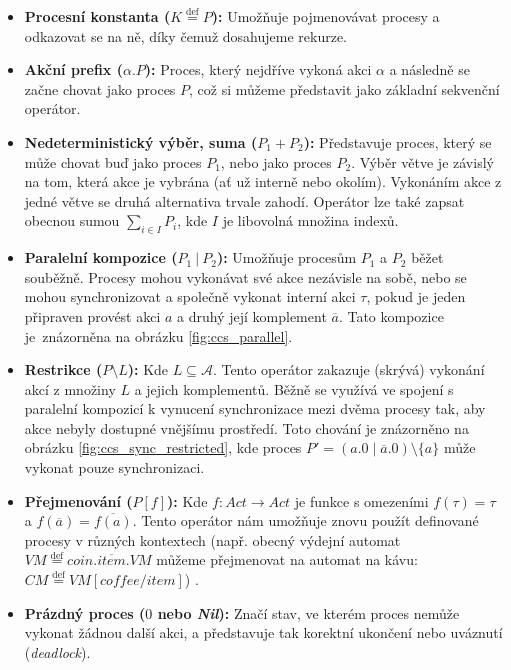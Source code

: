 \begin{itemize}
    \item \textbf{Procesní konstanta ($K \stackrel{\text{def}}{=} P$):} Umožňuje pojmenovávat procesy a odkazovat se na ně, díky čemuž dosahujeme rekurze.
    \item \textbf{Akční prefix ($\alpha.P$):} Proces, který nejdříve vykoná akci $\alpha$ a následně se začne chovat jako proces $P$, což si můžeme představit jako základní sekvenční operátor.
    \item \textbf{Nedeterministický výběr, suma ($P_{1} + P_{2}$):} Představuje proces, který se může chovat buď jako proces $P_{1}$, nebo jako proces $P_{2}$. Výběr větve je závislý na tom, která akce je vybrána (ať už interně nebo okolím). Vykonáním akce z jedné větve se druhá alternativa trvale zahodí. Operátor lze také zapsat obecnou sumou $\sum_{i \in I}^{} P_{i}$, kde $I$ je libovolná množina indexů.
    \item \textbf{Paralelní kompozice ($P_{1}\ |\ P_{2}$):} Umožňuje procesům $P_{1}$ a $P_{2}$ běžet souběžně. Procesy mohou vykonávat své akce nezávisle na sobě, nebo se mohou synchronizovat a společně vykonat interní akci $\tau$, pokud je jeden připraven provést akci $a$ a druhý její komplement $\overline{a}$. Tato kompozice je~znázorněna na obrázku \ref{fig:ccs_parallel}.
    \item \textbf{Restrikce ($P \setminus L$):} Kde $L \subseteq \mathcal{A}$. Tento operátor zakazuje (skrývá) vykonání akcí z množiny $L$ a jejich komplementů. Běžně se využívá ve spojení s paralelní kompozicí k vynucení synchronizace mezi dvěma procesy tak, aby akce nebyly dostupné vnějšímu prostředí. Toto chování je znázorněno na obrázku \ref{fig:ccs_sync_restricted}, kde proces $P' = (a.0 \mid \overline{a}.0) \setminus \{a\}$ může vykonat pouze synchronizaci.
    \item \textbf{Přejmenování ($P[f]$):} Kde $f: Act \to Act$ je funkce s omezeními $f(\tau) = \tau$ a $f(\overline{a}) = \overline{f(a)}$. Tento operátor nám umožňuje znovu použít definované procesy v různých kontextech (např. obecný výdejní automat $\mathit{VM} \stackrel{\text{def}}{=} coin.\overline{item}.\mathit{VM}$ můžeme přejmenovat na automat na kávu: $\mathit{CM} \stackrel{\text{def}}{=} \mathit{VM}[coffee / item]$) \cite{aceto2007reactive}.
    \item \textbf{Prázdný proces ($0$ nebo \textit{Nil}):} Značí stav, ve kterém proces nemůže vykonat žádnou další akci, a představuje tak korektní ukončení nebo uváznutí (\textit{deadlock}).
\end{itemize}

